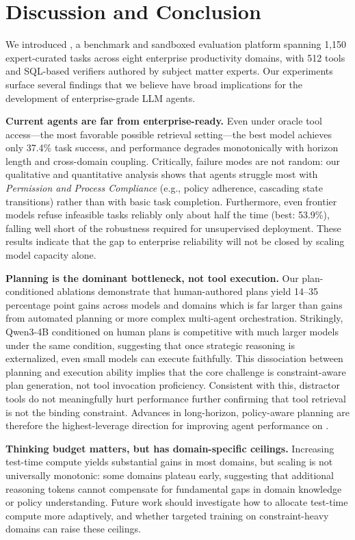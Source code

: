 \section{Discussion and Conclusion}

We introduced \ours{}, a benchmark and sandboxed evaluation platform spanning 1,150 expert-curated tasks across eight enterprise productivity domains, with 512 tools and SQL-based verifiers authored by subject matter experts. Our experiments surface several findings that we believe have broad implications for the development of enterprise-grade LLM agents.

\textbf{Current agents are far from enterprise-ready.}
Even under oracle tool access---the most favorable possible retrieval setting---the best model achieves only 37.4\% task success, and performance degrades monotonically with horizon length and cross-domain coupling. Critically, failure modes are not random: our qualitative and quantitative analysis shows that agents struggle most with \textit{Permission and Process Compliance} (e.g., policy adherence, cascading state transitions) rather than with basic task completion. Furthermore, even frontier models refuse infeasible tasks reliably only about half the time (best: 53.9\%), falling well short of the robustness required for unsupervised deployment. These results indicate that the gap to enterprise reliability will not be closed by scaling model capacity alone.

\textbf{Planning is the dominant bottleneck, not tool execution.}
Our plan-conditioned ablations demonstrate that human-authored plans yield 14--35 percentage point gains across models and domains which is far larger than gains from automated planning or more complex multi-agent orchestration. Strikingly, Qwen3-4B conditioned on human plans is competitive with much larger models under the same condition, suggesting that once strategic reasoning is externalized, even small models can execute faithfully. This dissociation between planning and execution ability implies that the core challenge is constraint-aware plan generation, not tool invocation proficiency. Consistent with this, distractor tools do not meaningfully hurt performance further confirming that tool retrieval is not the binding constraint. Advances in long-horizon, policy-aware planning are therefore the highest-leverage direction for improving agent performance on \ours{}.

\textbf{Thinking budget matters, but has domain-specific ceilings.}
Increasing test-time compute yields substantial gains in most domains, but scaling is not universally monotonic: some domains plateau early, suggesting that additional reasoning tokens cannot compensate for fundamental gaps in domain knowledge or policy understanding. Future work should investigate how to allocate test-time compute more adaptively, and whether targeted training on constraint-heavy domains can raise these ceilings.

